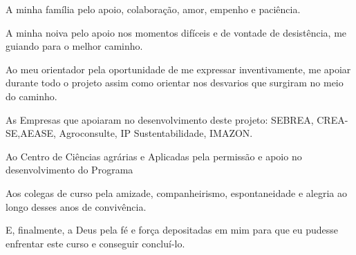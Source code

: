 \begin{agradecimentos}

A minha família pelo apoio, colaboração, amor, empenho e paciência. 

A minha noiva pelo apoio nos momentos difíceis e de vontade de desistência, me guiando para o melhor caminho.

Ao meu orientador pela oportunidade de me expressar inventivamente, me apoiar durante todo o projeto assim como orientar nos desvarios que surgiram no meio do caminho.

As Empresas que apoiaram no desenvolvimento deste projeto: SEBREA, CREA-SE,AEASE, Agroconsulte, IP Sustentabilidade, IMAZON.

Ao Centro de Ciências agrárias e Aplicadas pela permissão e apoio no desenvolvimento do Programa

Aos colegas de curso pela amizade, companheirismo, espontaneidade e alegria ao longo desses anos de convivência.

E, finalmente, a Deus pela fé e força depositadas em mim para que eu pudesse enfrentar este curso e conseguir concluí-lo.
\end{agradecimentos}
